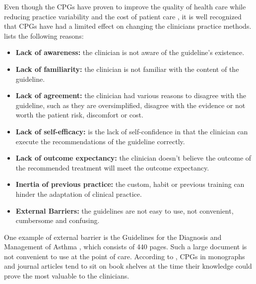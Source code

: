 
Even though the CPGs have proven to improve the quality of health care while reducing practice variability and the cost of patient care \parencite{DeClercq2008}, it is well recognized that CPGs have had a limited effect on changing the clinicians practice methods. \textcite{Cabana1999} lists the following reasons:
\begin{itemize}
	\item \textbf{Lack of awareness:} the clinician is not aware of the guideline's existence.
	\item \textbf{Lack of familiarity:} the clinician is not familiar with the content of the guideline.
	\item \textbf{Lack of agreement:} the clinician had various reasons to disagree with the guideline, such as they are oversimplified, disagree with the evidence or not worth the patient risk, discomfort or cost.
	\item \textbf{Lack of self-efficacy:} is the lack of self-confidence in that the clinician can execute the recommendations of the guideline correctly.
	\item \textbf{Lack of outcome expectancy:} the clinician doesn't believe the outcome of the recommended treatment will meet the outcome expectancy.
	\item \textbf{Inertia of previous practice:} the custom, habit or previous training can hinder the adaptation of clinical practice.
	\item \textbf{External Barriers:} the guidelines are not easy to use, not convenient, cumbersome and confusing.
\end{itemize}One example of external barrier is the Guidelines for the Diagnosis and Management of Asthma \parencite{NationalHeartLungandBloodInstitute2007}, which consists of 440 pages. Such a large document is not convenient to use at the point of care. According to \textcite{Shortliffe1998}, CPGs in monographs and journal articles tend to sit on book shelves at the time their knowledge could prove the most valuable to the clinicians. 

